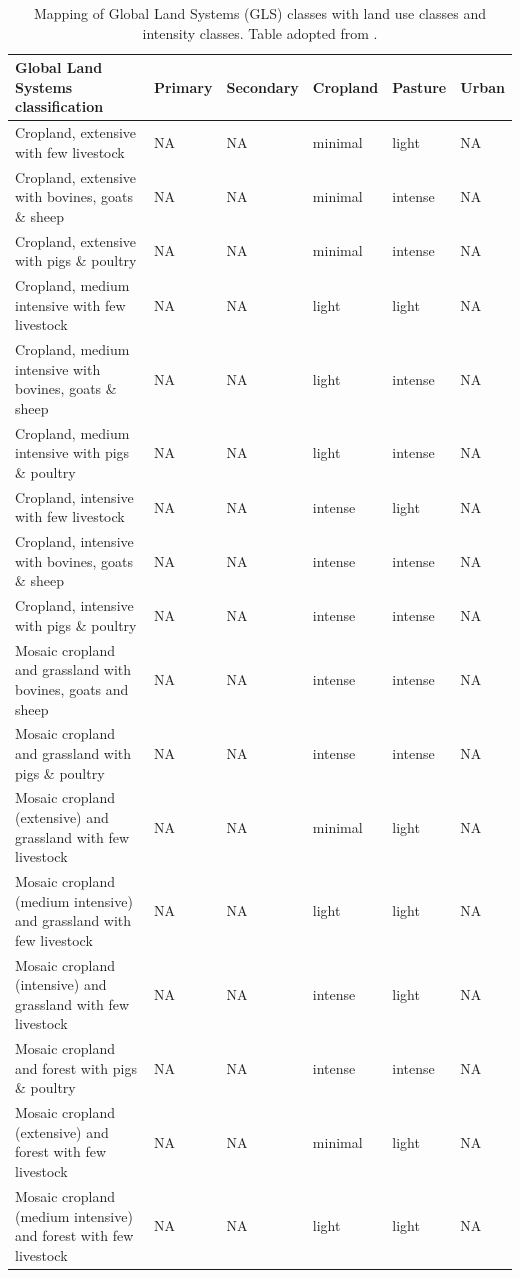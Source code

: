 \begin{table}[htb]
\centering
\caption{Mapping of Global Land Systems (GLS) classes with land use classes and intensity classes. Table adopted from \citet{newbold_global_2015}.}
\label{apx:ch4:tab_glsmapping}
\begin{tabularx}{1\textwidth}{Ylllll}
\toprule
Global Land Systems classification & Primary & Secondary & Cropland & Pasture & Urban \\
\bottomrule
Cropland, extensive with few livestock & NA & NA & minimal & light & NA \\
Cropland, extensive with bovines, goats \& sheep & NA & NA & minimal & intense & NA \\
Cropland, extensive with pigs \& poultry & NA & NA & minimal & intense & NA \\
Cropland, medium intensive with few livestock & NA & NA & light & light & NA \\
Cropland, medium intensive with bovines, goats \& sheep & NA & NA & light & intense & NA \\
Cropland, medium intensive with pigs \& poultry & NA & NA & light & intense & NA \\
Cropland, intensive with few livestock & NA & NA & intense & light & NA \\
Cropland, intensive with bovines, goats \& sheep & NA & NA & intense & intense & NA \\
Cropland, intensive with pigs \& poultry & NA & NA & intense & intense & NA \\
Mosaic cropland and grassland with bovines, goats and sheep & NA & NA & intense & intense & NA \\
Mosaic cropland and grassland with pigs \& poultry & NA & NA & intense & intense & NA \\
Mosaic cropland (extensive) and grassland with few livestock & NA & NA & minimal & light & NA \\
Mosaic cropland (medium intensive) and grassland with few livestock & NA & NA & light & light & NA \\
Mosaic cropland (intensive) and grassland with few livestock & NA & NA & intense & light & NA \\
Mosaic cropland and forest with pigs \& poultry & NA & NA & intense & intense & NA \\
Mosaic cropland (extensive) and forest with few livestock & NA & NA & minimal & light & NA \\
Mosaic cropland (medium intensive) and forest with few livestock & NA & NA & light & light & NA \\

\end{tabularx}
\end{table}
